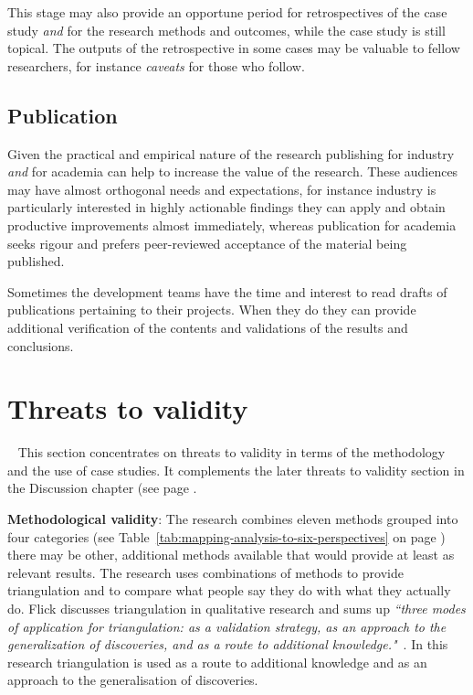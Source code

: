 This stage may also provide an opportune period for retrospectives of the case study \textit{and} for the research methods and outcomes, while the case study is still topical. The outputs of the retrospective in some cases may be valuable to fellow researchers, for instance \emph{caveats} for those who follow. 

\subsection{Publication}
Given the practical and empirical nature of the research publishing for industry \emph{and} for academia can help to increase the value of the research. These audiences may have almost orthogonal needs and expectations, for instance industry is particularly interested in highly actionable findings they can apply and obtain productive improvements almost immediately, whereas publication for academia seeks rigour and prefers peer-reviewed acceptance of the material being published.

Sometimes the development teams have the time and interest to read drafts of publications pertaining to their projects. When they do they can provide additional verification of the contents and validations of the results and conclusions.

\hrulefill

\section{Threats to validity}~\label{methodology-threats-to-validity-section}
This section concentrates on threats to validity in terms of the methodology and the use of case studies. It complements the later threats to validity section in the Discussion chapter (see page \pageref{discussion-threats-to-validity-section}.

\textbf{Methodological validity}: The research combines eleven methods grouped into four categories (see Table~\ref{tab:mapping-analysis-to-six-perspectives} on page \pageref{tab:mapping-analysis-to-six-perspectives}) there may be other, additional methods available that would provide at least as relevant results. The research uses combinations of methods to provide triangulation and to compare what people say they do with what they actually do. Flick discusses triangulation in qualitative research and sums up \emph{``three modes of application for triangulation: as a validation strategy, as an approach to the generalization of discoveries, and as a route to additional knowledge."}~\citep[p.183]{flick2004_triangulation_in_qualitative_research}. In this research triangulation is used as a route to additional knowledge and as an approach to the generalisation of discoveries.


